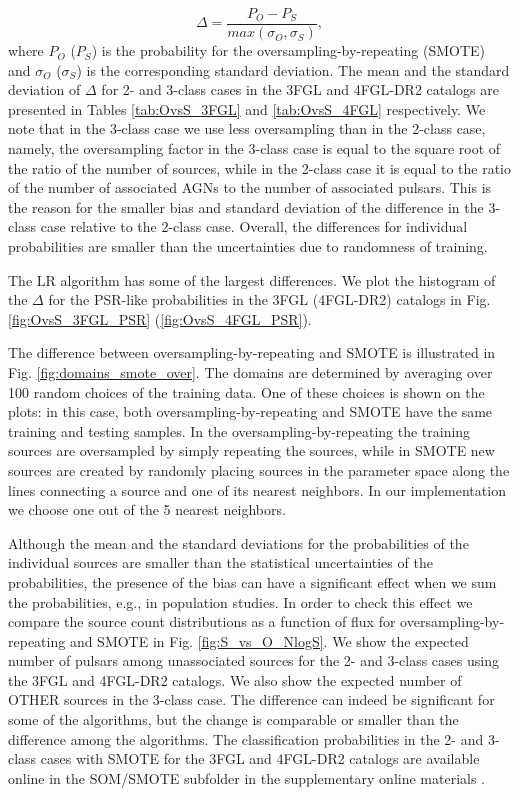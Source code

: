 \documentclass{aa}
\newcommand{\be}{\begin{equation}}
\newcommand{\ee}{\end{equation}}
\newcommand{\lb}{\label}
\begin{document}
\begin{appendix}
\be
\lb{eq:OS_diff}
\Delta = \frac{P_O - P_S}{max(\sigma_{O},\sigma_{S})},
\ee
where $P_O$ ($P_S$) is the probability for the oversampling-by-repeating (SMOTE) and $\sigma_O$ ($\sigma_S$) is the corresponding standard deviation. 
The mean and the standard deviation of $\Delta$ for 2- and 3-class cases in the 3FGL and 4FGL-DR2 catalogs are presented in 
Tables \ref{tab:OvsS_3FGL} and \ref{tab:OvsS_4FGL} respectively.
We note that in the 3-class case we use less oversampling than in the 2-class case, namely, the oversampling factor in the 3-class case is equal to the square root of the ratio of the number of sources, while in the 2-class case it is equal to the ratio of the number of associated AGNs to the number of associated pulsars.
This is the reason for the smaller bias and standard deviation of the difference in the 3-class case relative to the 2-class case.
Overall, the differences for individual probabilities are smaller than the uncertainties due to randomness of training.


The LR algorithm has some of the largest differences.
We plot the histogram of the $\Delta$ for the PSR-like probabilities in the 3FGL (4FGL-DR2) catalogs in Fig. \ref{fig:OvsS_3FGL_PSR}
(\ref{fig:OvsS_4FGL_PSR}).



The difference between oversampling-by-repeating and SMOTE is illustrated in Fig. \ref{fig:domains_smote_over}.
The domains are determined by averaging over 100 random choices of the training data.
One of these choices is shown on the plots: in this case, both oversampling-by-repeating and SMOTE have the same 
training and testing samples.
In the oversampling-by-repeating the training sources are oversampled by simply repeating the sources,
while in SMOTE new sources are created by randomly placing sources in the parameter space along the lines connecting a source
and one of its nearest neighbors. In our implementation we choose one out of the 5 nearest neighbors. 




Although the mean and the standard deviations for the probabilities of the individual sources are smaller than the 
statistical uncertainties of the probabilities, the presence of the bias can have a significant effect when we sum the probabilities, e.g., in population studies.
In order to check this effect we compare the source count distributions as a function of flux for oversampling-by-repeating and SMOTE 
in Fig. \ref{fig:S_vs_O_NlogS}.
We show the expected number of pulsars among unassociated sources for the 2- and 3-class cases using the 3FGL and 4FGL-DR2 catalogs.
We also show the expected number of OTHER sources in the 3-class case.
The difference can indeed be significant for some of the algorithms, but the change is comparable or smaller than the difference among the algorithms.
The classification probabilities in the 2- and 3-class cases with SMOTE for the 3FGL and 4FGL-DR2 catalogs 
are available online in the SOM/SMOTE subfolder in the supplementary online materials \citep{SOM_material}.



\end{appendix}
\end{document}
